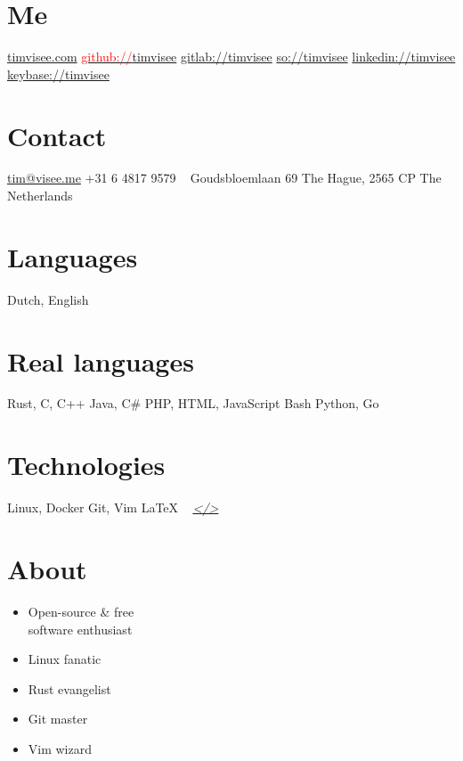 \documentclass[]{friggeri-cv}
\providecommand{\tightlist}{%
\setlength{\itemsep}{0pt}\setlength{\parskip}{0pt}}
\begin{document}


\begin{aside}
\section{Me}
\href{https://timvisee.com/}{timvisee.com}
\href{https://github.com/timvisee}{\textcolor{red}{github://}timvisee}
\href{https://gitlab.com/timvisee}{gitlab://timvisee}
\href{https://stackoverflow.com/users/1000145}{so://timvisee}
\href{https://linkedin.com/in/timvisee}{linkedin://timvisee}
\href{https://keybase.io/timvisee}{keybase://timvisee}
\section{Contact}
\href{mailto:tim@visee.me}{tim@visee.me}
+31 6 4817 9579
~
Goudsbloemlaan 69
The Hague, 2565 CP
The Netherlands
\section{Languages}
Dutch, English
\section{Real languages}
Rust, C, C++
Java, C\#
PHP, HTML, JavaScript
Bash
Python, Go
\section{Technologies}
Linux, Docker
Git, Vim
\LaTeX{}
~
\textit{\href{https://github.com/timvisee/cv}{</>}}
\end{aside}


\section{About}
\begin{multicols}{2}
\begin{itemize}
  \tightlist{}
  \item Open-source \& free \\software enthusiast
  \item Linux fanatic
  \item Rust evangelist
  \item Git master
  \item Vim wizard
\end{itemize}
\end{multicols}
\end{document}
